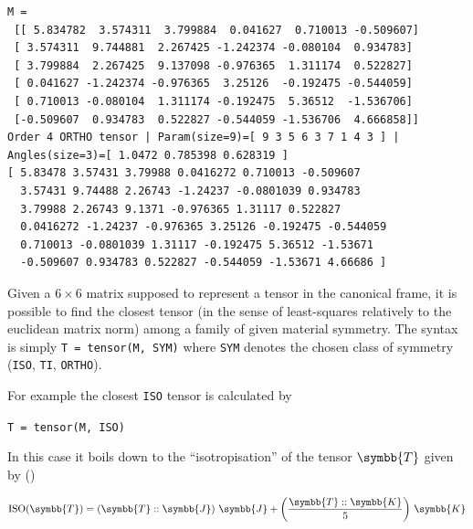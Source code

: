 \documentclass[
  a4paper,
  numbers=noendperiod,
  DIV=12]{scrreprt}
\newcommand{\uuuu}[1]{{\symbb{{#1}}}}
\DeclareMathOperator{\ISO}{ISO}
\begin{document}
\begin{verbatim}
M =
 [[ 5.834782  3.574311  3.799884  0.041627  0.710013 -0.509607]
 [ 3.574311  9.744881  2.267425 -1.242374 -0.080104  0.934783]
 [ 3.799884  2.267425  9.137098 -0.976365  1.311174  0.522827]
 [ 0.041627 -1.242374 -0.976365  3.25126  -0.192475 -0.544059]
 [ 0.710013 -0.080104  1.311174 -0.192475  5.36512  -1.536706]
 [-0.509607  0.934783  0.522827 -0.544059 -1.536706  4.666858]]
Order 4 ORTHO tensor | Param(size=9)=[ 9 3 5 6 3 7 1 4 3 ] | Angles(size=3)=[ 1.0472 0.785398 0.628319 ]
[ 5.83478 3.57431 3.79988 0.0416272 0.710013 -0.509607 
  3.57431 9.74488 2.26743 -1.24237 -0.0801039 0.934783 
  3.79988 2.26743 9.1371 -0.976365 1.31117 0.522827 
  0.0416272 -1.24237 -0.976365 3.25126 -0.192475 -0.544059 
  0.710013 -0.0801039 1.31117 -0.192475 5.36512 -1.53671 
  -0.509607 0.934783 0.522827 -0.544059 -1.53671 4.66686 ]
\end{verbatim}

Given a \(6×6\) matrix supposed to represent a tensor in the canonical
frame, it is possible to find the closest tensor (in the sense of
least-squares relatively to the euclidean matrix norm) among a family of
given material symmetry. The syntax is simply
\texttt{T\ =\ tensor(M,\ SYM)} where \texttt{SYM} denotes the chosen
class of symmetry (\texttt{ISO}, \texttt{TI}, \texttt{ORTHO}).

For example the closest \texttt{ISO} tensor is calculated by

\texttt{T\ =\ tensor(M,\ ISO)}

In this case it boils down to the ``isotropisation'' of the tensor
\(\uuuu{T}\) given by ()

\[
\ISO(\uuuu{T})=\left(\uuuu{T}::\uuuu{J}\right)\,\uuuu{J}+\left(\frac{\uuuu{T}::\uuuu{K}}{5}\right)\,\uuuu{K}
\]
\end{document}
